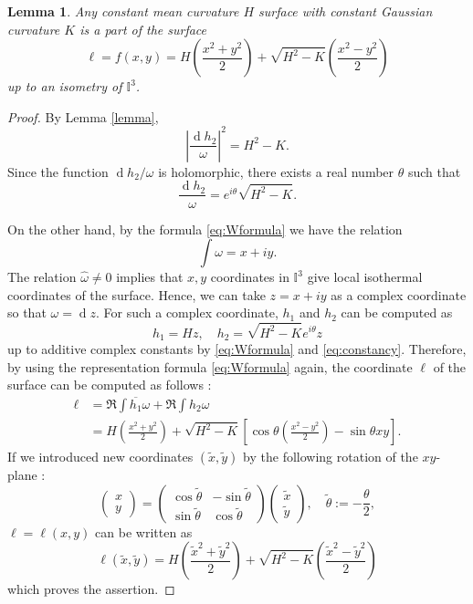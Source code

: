\documentclass[10pt,a4paper]{amsart}
\newtheorem{lemma}{Lemma}
\begin{document}
\begin{lemma}\label{lemma2}
Any constant mean curvature $H$ surface with constant Gaussian curvature $K$ is a part of the surface
	\begin{equation}\label{eq:EHP}
	\ell = f(x,y)=H\left( \frac{x^2+y^2}{2}\right)+ \sqrt{H^2-K}\left( \frac{x^2-y^2}{2}\right)
	\end{equation}
up to an isometry of $\mathbb{I}^3$.
\end{lemma}

\begin{proof}
By Lemma \ref{lemma}, 
	\[
		\left|\frac{\operatorname{d}\!h_2}{\omega} \right|^2 = H^2-K.
	\]
Since the function $\operatorname{d}\!h_2/\omega $ is holomorphic, there exists a real number $\theta$ such that 
	\begin{equation}\label{eq:constancy}
	\frac{\operatorname{d}\!h_2}{\omega} =e^{i\theta}\sqrt{H^2-K}.
	\end{equation}

On the other hand, by the formula \eqref{eq:Wformula} we have the relation
	\[
		\int{\omega} = x+iy.
	\]
The relation $\hat{\omega}\neq 0$ implies that $x,y$ coordinates in $\mathbb{I}^3$ give local isothermal coordinates of the surface. Hence, we can take $z=x+iy$ as a complex coordinate so that $\omega=\operatorname{d}\!z$. 
For such a complex coordinate, $h_1$ and $h_2$ can be computed as
	\[
		h_1=Hz,\quad h_2=\sqrt{H^2-K}e^{i\theta}z
	\]
up to additive complex constants by \eqref{eq:Wformula} and \eqref{eq:constancy}.
Therefore, by using the representation formula \eqref{eq:Wformula} again, the coordinate $\ell$ of the surface can be computed as follows :
\begin{align*}
\ell &= \Re{\int{\overline{h_1}\omega}} + \Re{\int{h_2\omega}} \\ 
&=H\left(\frac{x^2+y^2}{2} \right) +\sqrt{H^2-K}\left[ \cos{\theta}\left(\frac{x^2-y^2}{2}\right)-\sin{\theta} xy\right].
\end{align*}
If we introduced new coordinates $(\tilde{x},\tilde{y})$ by the following rotation of the $xy$-plane :
	\[
		\begin{pmatrix} x \\ y \end{pmatrix} = \begin{pmatrix} \cos{\tilde{\theta}}  & -\sin{\tilde{\theta}} \\ \sin{\tilde{\theta}} & \cos{\tilde{\theta}} \end{pmatrix}
\begin{pmatrix} \tilde{x} \\ \tilde{y} \end{pmatrix}, \quad \tilde{\theta}:=-\frac{\theta}{2},
	\]
$\ell=\ell(x,y)$ can be written as
	\[
		\ell(\tilde{x},\tilde{y})=H\left(\frac{\tilde{x}^2+\tilde{y}^2}{2}\right)+\sqrt{H^2-K}\left(\frac{\tilde{x}^2-\tilde{y}^2}{2}\right)
	\]
which proves the assertion.
\end{proof}
\end{document}
